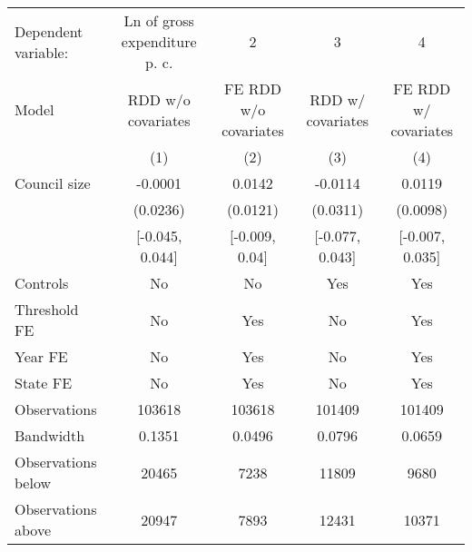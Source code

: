 \begin{tabular}{lcccc}
  \toprule
 \midrule
Dependent variable: & Ln of gross expenditure p. c. & 2 & 3 & 4 \\ 
 Model & RDD w/o covariates & FE RDD w/o covariates & RDD w/ covariates & FE RDD w/ covariates \\ 
   & (1) & (2) & (3) & (4) \\ 
   \midrule
Council size & -0.0001 & 0.0142 & -0.0114 & 0.0119 \\ 
   & (0.0236) & (0.0121) & (0.0311) & (0.0098) \\ 
   & [-0.045, 0.044] & [-0.009, 0.04] & [-0.077, 0.043] & [-0.007, 0.035] \\ 
   \midrule
Controls & No & No & Yes & Yes \\ 
  Threshold FE & No & Yes & No & Yes \\ 
  Year FE & No & Yes & No & Yes \\ 
  State FE & No & Yes & No & Yes \\ 
   \midrule
Observations & 103618 & 103618 & 101409 & 101409 \\ 
  Bandwidth & 0.1351 & 0.0496 & 0.0796 & 0.0659 \\ 
  Observations below & 20465 & 7238 & 11809 & 9680 \\ 
  Observations above & 20947 & 7893 & 12431 & 10371 \\ 
   \midrule
 \bottomrule
\end{tabular}
